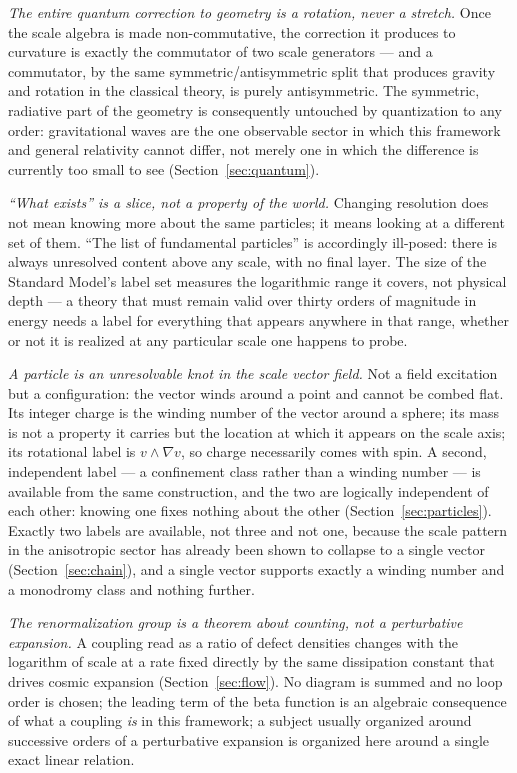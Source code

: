 \documentclass[aps,prd,twocolumn,superscriptaddress,nofootinbib]{revtex4-2}
\begin{document}
\emph{The entire quantum correction to geometry is a rotation, never a
stretch.} Once the scale algebra is made non-commutative, the correction
it produces to curvature is exactly the commutator of two scale
generators — and a commutator, by the same symmetric/antisymmetric split
that produces gravity and rotation in the classical theory, is purely
antisymmetric. The symmetric, radiative part of the geometry is
consequently untouched by quantization to any order: gravitational waves
are the one observable sector in which this framework and general
relativity cannot differ, not merely one in which the difference is
currently too small to see (Section~\ref{sec:quantum}).

\emph{``What exists'' is a slice, not a property of the world.} Changing
resolution does not mean knowing more about the same particles; it means
looking at a different set of them. ``The list of fundamental
particles'' is accordingly ill-posed: there is always unresolved content
above any scale, with no final layer. The size of the Standard Model's
label set measures the logarithmic range it covers, not physical depth
— a theory that must remain valid over thirty orders of magnitude in
energy needs a label for everything that appears anywhere in that range,
whether or not it is realized at any particular scale one happens to
probe.

\emph{A particle is an unresolvable knot in the scale vector field.} Not
a field excitation but a configuration: the vector winds around a point
and cannot be combed flat. Its integer charge is the winding number of
the vector around a sphere; its mass is not a property it carries but
the location at which it appears on the scale axis; its rotational label
is $v \wedge \nabla v$, so charge necessarily comes with spin. A second,
independent label — a confinement class rather than a winding number —
is available from the same construction, and the two are logically
independent of each other: knowing one fixes nothing about the other
(Section~\ref{sec:particles}). Exactly two labels are available, not
three and not one, because the scale pattern in the anisotropic sector
has already been shown to collapse to a single vector
(Section~\ref{sec:chain}), and a single vector supports exactly a
winding number and a monodromy class and nothing further.

\emph{The renormalization group is a theorem about counting, not a
perturbative expansion.} A coupling read as a ratio of defect densities
changes with the logarithm of scale at a rate fixed directly by the same
dissipation constant that drives cosmic expansion (Section~\ref{sec:flow}).
No diagram is summed and no loop order is chosen; the leading term of
the beta function is an algebraic consequence of what a coupling
\emph{is} in this framework; a subject usually organized around
successive orders of a perturbative expansion is organized here around a
single exact linear relation.
\end{document}
